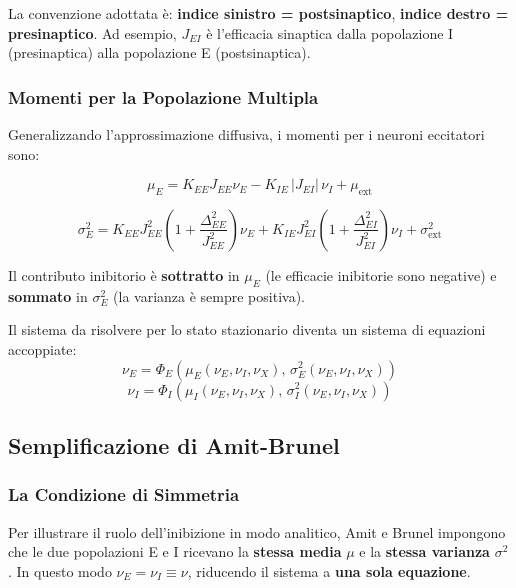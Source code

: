 La convenzione adottata è: \textbf{indice sinistro = postsinaptico}, \textbf{indice destro = presinaptico}. Ad esempio, $J_{EI}$ è l'efficacia sinaptica dalla popolazione I (presinaptica) alla popolazione E (postsinaptica).

\subsubsection{Momenti per la Popolazione Multipla}

Generalizzando l'approssimazione diffusiva, i momenti per i neuroni eccitatori sono:

\begin{equation}
\mu_E = K_{EE} J_{EE} \nu_E - K_{IE}\,|J_{EI}|\,\nu_I + \mu_{\text{ext}}
\end{equation}

\begin{equation}
\sigma_E^2 = K_{EE} J_{EE}^2\!\left(1 + \frac{\Delta_{EE}^2}{J_{EE}^2}\right)\!\nu_E + K_{IE} J_{EI}^2\!\left(1 + \frac{\Delta_{EI}^2}{J_{EI}^2}\right)\! \nu_I + \sigma^2_{\text{ext}}
\end{equation}

Il contributo inibitorio è \textbf{sottratto} in $\mu_E$ (le efficacie inibitorie sono negative) e \textbf{sommato} in $\sigma^2_E$ (la varianza è sempre positiva). 

Il sistema da risolvere per lo stato stazionario diventa un sistema di equazioni accoppiate:
\begin{equation}
\nu_E = \Phi_E\!\left(\mu_E(\nu_E, \nu_I, \nu_X),\, \sigma_E^2(\nu_E, \nu_I, \nu_X)\right)
\end{equation}
\begin{equation}
\nu_I = \Phi_I\!\left(\mu_I(\nu_E, \nu_I, \nu_X),\, \sigma_I^2(\nu_E, \nu_I, \nu_X)\right)
\end{equation}


\subsection{Semplificazione di Amit-Brunel}

\subsubsection{La Condizione di Simmetria}

Per illustrare il ruolo dell'inibizione in modo analitico, Amit e Brunel impongono che le due popolazioni E e I ricevano la \textbf{stessa media} $\mu$ e la \textbf{stessa varianza} $\sigma^2$. In questo modo $\nu_E = \nu_I \equiv \nu$, riducendo il sistema a \textbf{una sola equazione}.

